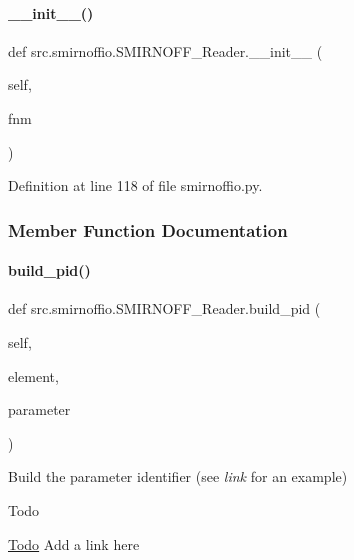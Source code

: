 \paragraph{\texorpdfstring{\+\_\+\+\_\+init\+\_\+\+\_\+()}{\_\_init\_\_()}}
{\footnotesize\ttfamily def src.\+smirnoffio.\+S\+M\+I\+R\+N\+O\+F\+F\+\_\+\+Reader.\+\_\+\+\_\+init\+\_\+\+\_\+ (\begin{DoxyParamCaption}\item[{}]{self,  }\item[{}]{fnm }\end{DoxyParamCaption})}



Definition at line 118 of file smirnoffio.\+py.



\subsubsection{Member Function Documentation}
\mbox{\label{classsrc_1_1smirnoffio_1_1SMIRNOFF__Reader_ab3ceaf1974b7b1839ddaaa0cc3fc24b8}} 
\paragraph{\texorpdfstring{build\+\_\+pid()}{build\_pid()}}
{\footnotesize\ttfamily def src.\+smirnoffio.\+S\+M\+I\+R\+N\+O\+F\+F\+\_\+\+Reader.\+build\+\_\+pid (\begin{DoxyParamCaption}\item[{}]{self,  }\item[{}]{element,  }\item[{}]{parameter }\end{DoxyParamCaption})}



Build the parameter identifier (see {\itshape link} for an example) 

\begin{DoxyRefDesc}{Todo}
\item[\hyperlink{todo__todo000015}{Todo}]Add a link here \end{DoxyRefDesc}


